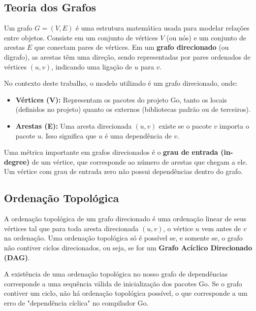 \documentclass[12pt]{article}
\begin{document}
\subsection{Teoria dos Grafos}
Um grafo $G = (V, E)$ é uma estrutura matemática usada para modelar relações entre objetos. Consiste em um conjunto de vértices $V$ (ou nós) e um conjunto de arestas $E$ que conectam pares de vértices. Em um \textbf{grafo direcionado} (ou digrafo), as arestas têm uma direção, sendo representadas por pares ordenados de vértices $(u, v)$, indicando uma ligação de $u$ para $v$.

No contexto deste trabalho, o modelo utilizado é um grafo direcionado, onde:
\begin{itemize}
    \item \textbf{Vértices (V):} Representam os pacotes do projeto Go, tanto os locais (definidos no projeto) quanto os externos (bibliotecas padrão ou de terceiros).
    \item \textbf{Arestas (E):} Uma aresta direcionada $(u, v)$ existe se o pacote $v$ importa o pacote $u$. Isso significa que $u$ é uma dependência de $v$.
\end{itemize}

Uma métrica importante em grafos direcionados é o \textbf{grau de entrada (in-degree)} de um vértice, que corresponde ao número de arestas que chegam a ele. Um vértice com grau de entrada zero não possui dependências dentro do grafo.

\subsection{Ordenação Topológica}
A ordenação topológica de um grafo direcionado é uma ordenação linear de seus vértices tal que para toda aresta direcionada $(u, v)$, o vértice $u$ vem antes de $v$ na ordenação. Uma ordenação topológica só é possível se, e somente se, o grafo não contiver ciclos direcionados, ou seja, se for um \textbf{Grafo Acíclico Direcionado (DAG)}.

A existência de uma ordenação topológica no nosso grafo de dependências corresponde a uma sequência válida de inicialização dos pacotes Go. Se o grafo contiver um ciclo, não há ordenação topológica possível, o que corresponde a um erro de "dependência cíclica" no compilador Go.
\end{document}
